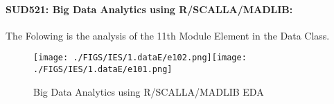 \documentclass[12pt]{extreport}
\begin{document}
\paragraph{\large SUD521: Big Data Analytics using R/SCALLA/MADLIB:\\
}
The Folowing is the analysis of the 11th Module Element in the Data Class. 

\begin{figure}[H]
	\centering
	\texttt{[image: ./FIGS/IES/1.dataE/e102.png]}\texttt{[image: ./FIGS/IES/1.dataE/e101.png]}
	\caption{Big Data Analytics using R/SCALLA/MADLIB EDA}
	\label{fig:16}
\end{figure}




\begin{comment}}

The numbers Below and the boxplots above show that in this element  PSI and TSI students performance is roughly equivalent
and that their performance is almost better than half of the MP students.
\begin{enumerate}	
	\item The MP Class Box-Plot:
	\begin{enumerate}
		\item MAX = 19 {} {} {} {} {} {} {} {} UQ = 18 {} {} {} {} {} {} {} {} Median = 15
		\item LQ = 12.5 {} {} {} {} {} {} {} {} MIN = 11 {} {} {} {} {} {} {} {} IQR = 18 - 12.5 = 5.5
	\end{enumerate}
	\item The PSI Class Box-Plot:
	\begin{enumerate}
		\item MAX = 16 {} {} {} {} {} {} {} {} UQ = 16 {} {} {} {} {} {} {} {} Median = 16
		\item LQ = 14.5 {} {} {} {} {} {} {} {} MIN = 14 {} {} {} {} {} {} {} {} IQR = a-b = c	
	\end{enumerate}
	\item The TSI Class Box-Plot:
	\begin{enumerate}
		\item MAX = 16 {} {} {} {} {} {} {} {} UQ = 14.5 {} {} {} {} {} {} {} {} Median = 12
		\item LQ = 11 {} {} {} {} {} {} {} {} MIN =	11 {} {} {} {} {} {} {} {} IQR = 14.5 - 11 = 3.5	
	\end{enumerate}
\end{enumerate}

\subparagraph{Interpretation of the histogram:}
This Frequency Distribution is (Skeness) with the following descriptive statistics:

\begin{enumerate}
	\item Mean = 14.5
	\item STD = 2.88
	\item Range = 19 - 10 = 9
	\item IQR = 16 - 12 = 4
\end{enumerate}


\end{comment}
\end{document}
